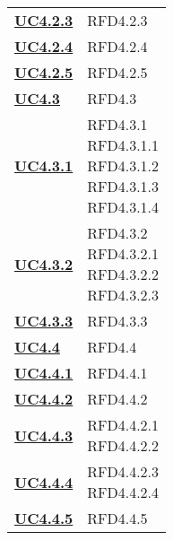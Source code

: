 \begin{longtable}[H]{| >{\centering\bfseries}p{8cm} | >{\centering\arraybackslash}p{8cm} |}
    \hyperref[par:uc4.2.3]{UC4.2.3}  & RFD4.2.3 \\

    \hyperref[par:uc4.2.4]{UC4.2.4} & RFD4.2.4 \\

    \hyperref[par:uc4.2.5]{UC4.2.5} & RFD4.2.5 \\

    \hyperref[ssub:uc4.3]{UC4.3} & RFD4.3 \\

    \hyperref[par:uc4.3.1]{UC4.3.1} & \makecell{
        \rule{0pt}{4ex}
        RFD4.3.1 \\ 
        RFD4.3.1.1 \\ 
        RFD4.3.1.2 \\ 
        RFD4.3.1.3 \\ 
        RFD4.3.1.4
        \rule{0pt}{4ex}
        } \\

    \hyperref[par:uc4.3.2]{UC4.3.2} & \makecell{
        \rule{0pt}{4ex}
        RFD4.3.2 \\ 
        RFD4.3.2.1 \\
        RFD4.3.2.2 \\
        RFD4.3.2.3
        \rule{0pt}{4ex}
        } \\

    \hyperref[par:uc4.3.3]{UC4.3.3} & RFD4.3.3 \\


    \hyperref[ssub:uc4.4]{UC4.4} & RFD4.4 \\

    \hyperref[par:uc4.4.1]{UC4.4.1} & RFD4.4.1 \\

    \hyperref[par:uc4.4.2]{UC4.4.2} & RFD4.4.2 \\

    \hyperref[par:uc4.4.3]{UC4.4.3}  & \makecell{
        \rule{0pt}{4ex}
        RFD4.4.2.1 \\ 
        RFD4.4.2.2
        \rule{0pt}{4ex}
        } \\

    \hyperref[par:uc4.4.4]{UC4.4.4} & \makecell{
        \rule{0pt}{4ex}
        RFD4.4.2.3 \\ 
        RFD4.4.2.4
        \rule{0pt}{4ex}
        } \\

    \hyperref[par:uc4.4.5]{UC4.4.5} & RFD4.4.5 \\





\end{longtable}
